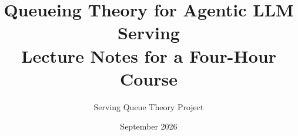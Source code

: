 
\title{Queueing Theory for Agentic LLM Serving\\[0.4em]
\large Lecture Notes for a Four-Hour Course}
\author{Serving Queue Theory Project}
\date{September 2026}

\hypersetup{pageanchor=false}
\maketitle
\hypersetup{pageanchor=true}
\tableofcontents








